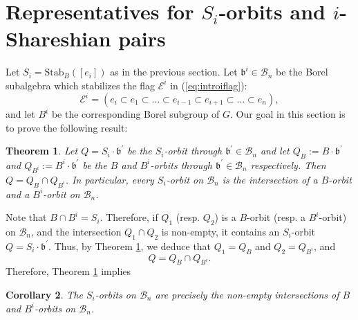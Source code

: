 \documentclass[12pt]{amsart}
\numberwithin{equation}{section}
\newtheorem{thm}{Theorem}[section]
\newtheorem{cor}[thm]{Corollary}
\theoremstyle{remark}
\theoremstyle{definition}
\newcommand{\fb}{\mbox{${\mathfrak b}$}}
\newcommand{\B}{\mathcal{B}}
\begin{document}
\section{Representatives for $S_{i}$-orbits and $i$-Shareshian pairs}\label{s:reps}
Let $S_{i}=\mbox{Stab}_{B}([e_{i}])$ as in the previous section.  Let 
$\fb^{i}\in\B_{n}$ be the Borel subalgebra which stabilizes the flag $\mathcal{E}^{i}$ in (\ref{eq:introiflag}):
\begin{equation}\label{eq:Fiflag}
\mathcal{E}^{i}=(e_{i}\subset e_{1}\subset\dots\subset e_{i-1}\subset e_{i+1}\subset \dots\subset e_{n}),
\end{equation}
and let $B^{i}$ be the corresponding Borel subgroup of $G.$
Our goal in this section is to prove the following result:
\begin{thm}\label{thm:ShpairsforSi}
Let $Q=S_{i}\cdot\fb^{\prime}$ be the $S_{i}$-orbit through $\fb^{\prime}\in\B_{n}$ and let $Q_{B}:=B\cdot\fb^{\prime}$ and $Q_{B^{i}}:=B^{i}\cdot\fb^{\prime}$ 
be the $B$ and $B^{i}$-orbits through $\fb^{\prime}\in\B_{n}$ respectively.  Then $Q=Q_{B}\cap Q_{B^{i}}$.  In particular, every $S_{i}$-orbit on $\B_{n}$ is the intersection of a $B$-orbit and a $B^{i}$-orbit on $\B_{n}$. 
\end{thm}

Note that $B\cap B^{i}=S_{i}$.  Therefore, if $Q_{1}$ (resp. $Q_{2}$) is a $B$-orbit  (resp. a $B^{i}$-orbit) on $\B_{n}$, and the intersection $Q_{1}\cap Q_{2}$ is non-empty, it contains an $S_{i}$-orbit $Q=S_{i}\cdot\fb^{\prime}$.  Thus, by Theorem \ref{thm:ShpairsforSi}, we deduce that $Q_{1}=Q_{B}$ and $Q_{2}=Q_{B^{i}}$, and
\begin{equation}\label{eq:intersect}
Q=Q_{B}\cap Q_{B^{i}}.
\end{equation}
Therefore, Theorem \ref{thm:ShpairsforSi} implies 
\begin{cor}\label{c:intersect}
The $S_{i}$-orbits on $\B_{n}$ are precisely the non-empty intersections of $B$ and $B^{i}$-orbits on $\B_{n}$. 
\end{cor}
\end{document}
